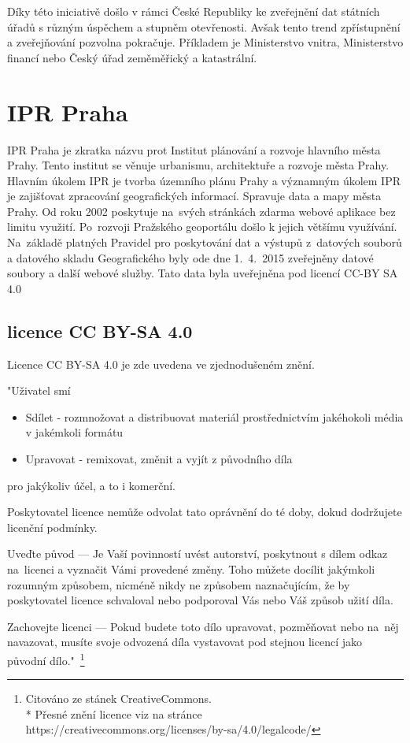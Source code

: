 Díky této iniciativě došlo v rámci České Republiky ke zveřejnění
dat státních úřadů s různým úspěchem a stupněm otevřenosti.
Avšak tento trend zpřístupnění a zveřejňování pozvolna pokračuje.
Příkladem je Ministerstvo vnitra, Ministerstvo financí nebo Český úřad zeměměřický a katastrální.


\section{IPR Praha}
\label{IPR Praha}
IPR Praha je zkratka názvu prot Institut plánování a rozvoje
hlavního města Prahy. Tento institut se věnuje urbanismu, architektuře
a rozvoje města Prahy. Hlavním úkolem IPR je tvorba územního plánu
Prahy a významným úkolem IPR je zajišťovat zpracování geografických
informací. Spravuje data a mapy města Prahy. Od roku 2002 poskytuje
na~svých stránkách zdarma webové aplikace bez limitu využití.
Po~rozvoji Pražského geoportálu došlo k jejich většímu využívání.
Na~základě platných Pravidel pro poskytování dat a výstupů z~datových
souborů a datového skladu Geografického byly ode dne 1.~4.~2015
zveřejněny datové soubory a další webové služby. Tato data byla
uveřejněna pod licencí CC-BY SA 4.0 \cite{IPR}

\subsection{licence CC BY-SA 4.0}
\label{licence CC BY-SA 4.0}
Licence CC BY-SA 4.0 je zde uvedena ve zjednodušeném znění.

"Uživatel smí

\begin{itemize}
    \item   Sdílet - rozmnožovat a distribuovat materiál prostřednictvím jakéhokoli média v jakémkoli formátu
    \item   Upravovat - remixovat, změnit a vyjít z původního díla
\end{itemize}
pro jakýkoliv účel, a to i komerční.

Poskytovatel licence nemůže odvolat tato oprávnění do té doby, dokud dodržujete licenční podmínky.

Uveďte původ — Je Vaší povinností uvést autorství, poskytnout s dílem odkaz
na~licenci a vyznačit Vámi provedené změny. Toho můžete docílit jakýmkoli
rozumným způsobem, nicméně nikdy ne způsobem naznačujícím, že by poskytovatel
licence schvaloval nebo podporoval Vás nebo Váš způsob užití díla.

Zachovejte licenci — Pokud budete toto dílo upravovat, pozměňovat nebo
na~něj navazovat, musíte svoje odvozená díla vystavovat pod stejnou
licencí jako původní dílo."~\footnote{Citováno ze stánek CreativeCommons. \\*
Přesné znění licence viz na stránce https://creativecommons.org/licenses/by-sa/4.0/legalcode/}
